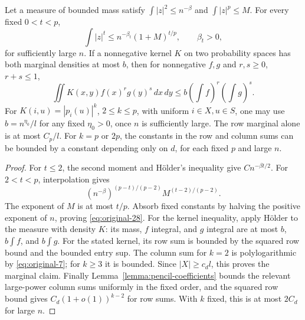 \begin{lemma}\label{lem:early-interpolation}
Let a measure of bounded mass satisfy \(\int|z|^2\le n^{-\beta}\)
and \(\int|z|^p\le M\). For every fixed \(0<t<p\),
\begin{equation}
 \int|z|^t\le n^{-\beta_t}(1+M)^{t/p},
 \qquad \beta_t>0,
\label{eq:original-28}
\end{equation}
for sufficiently large \(n\). If a nonnegative kernel \(K\) on two
probability spaces has both marginal densities at most \(b\), then
for nonnegative \(f,g\) and \(r,s\ge0\), \(r+s\le1\),
\[
 \iint K(x,y)f(x)^rg(y)^s\,dx\,dy
 \le b\left(\int f\right)^r\left(\int g\right)^s.
\]
For \(K(i,u)=|p_i(u)|^k\), \(2\le k\le p\), with uniform
\(i\in X,u\in S\), one may use \(b=n^{\eta_0}/l\) for any
fixed \(\eta_0>0\), once \(n\) is sufficiently large. The row
marginal alone is at most \(C_p/l\). For \(k=p\) or \(2p\),
the constants in the row and column sums can be bounded by a constant
depending only on \(d\), for each fixed \(p\) and large \(n\).
\end{lemma}
\begin{proof}
For \(t\le2\), the second moment and H\"older's inequality give
\(C n^{-\beta t/2}\). For \(2<t<p\), interpolation gives
\[
 (n^{-\beta})^{(p-t)/(p-2)}M^{(t-2)/(p-2)}.
\]
The exponent of \(M\) is at most \(t/p\). Absorb fixed constants
by halving the positive exponent of \(n\), proving
\eqref{eq:original-28}.
For the kernel inequality, apply H\"older to the measure with density
\(K\): its mass, \(f\) integral, and \(g\) integral are at most
\(b\), \(b\int f\), and \(b\int g\).
For the stated kernel, its row sum is bounded by the squared row
bound and the bounded entry sup. The column sum for \(k=2\) is
polylogarithmic by \eqref{eq:original-7}; for \(k\ge3\) it is
bounded. Since \(|X|\ge c_dl\), this proves the marginal claim.
Finally Lemma~\ref{lemma:pencil-coefficients} bounds the relevant large-power column
sums uniformly in the fixed order, and the squared row bound gives
\(C_d(1+o(1))^{k-2}\) for row sums. With \(k\) fixed, this is
at most \(2C_d\) for large \(n\).
\end{proof}

